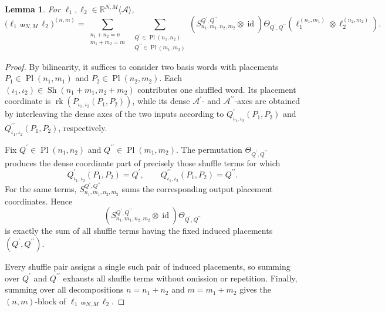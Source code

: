 \documentclass{amsart}
\newtheorem{lemma}[theorem]{Lemma}
\theoremstyle{definition}
\theoremstyle{remark}
\begin{document}
\begin{lemma}
\label{lem:ordered_shuffle}
For
$\ell_1,\ell_2\in
\mathbb{R}^{N,M}\langle\mathcal{A}\rangle$,
\[
    \bigl(
        \ell_1\shuffle_{N,M}\ell_2
    \bigr)^{(n,m)}
    =
    \sum_{\substack{
        n_1+n_2=n\\
        m_1+m_2=m
    }}
    \;
    \sum_{\substack{
        Q^{\prime}\in\operatorname{Pl}(n_1,n_2)\\
        Q^{\prime\prime}\in\operatorname{Pl}(m_1,m_2)
    }}
    \left(
        S^{Q^{\prime},Q^{\prime\prime}}_{n_1,m_1,n_2,m_2}
        \otimes
        \operatorname{id}
    \right)
    \Theta_{Q^{\prime},Q^{\prime\prime}}
    \left(
        \ell_1^{(n_1,m_1)}
        \otimes
        \ell_2^{(n_2,m_2)}
    \right).
\]
\end{lemma}

\begin{proof}
By bilinearity, it suffices to consider two basis words with placements
$P_1\in\operatorname{Pl}(n_1,m_1)$ and
$P_2\in\operatorname{Pl}(n_2,m_2)$. Each
$(\iota_1,\iota_2)\in
\operatorname{Sh}(n_1+m_1,n_2+m_2)$ contributes one shuffled word. Its
placement coordinate is $\operatorname{rk}
        \left(
            P_{\iota_1,\iota_2}(P_1,P_2)
        \right)$,
while its dense $\mathcal{A}^{\prime}$- and
$\mathcal{A}^{\prime\prime}$-axes are obtained by interleaving the dense
axes of the two inputs according to
$Q^{\prime}_{\iota_1,\iota_2}(P_1,P_2)$ and
$Q^{\prime\prime}_{\iota_1,\iota_2}(P_1,P_2)$, respectively.

Fix
$Q^{\prime}\in\operatorname{Pl}(n_1,n_2)$ and
$Q^{\prime\prime}\in\operatorname{Pl}(m_1,m_2)$.
The permutation $\Theta_{Q^{\prime},Q^{\prime\prime}}$ produces the
dense coordinate part of precisely those shuffle terms for which
\[
    Q^{\prime}_{\iota_1,\iota_2}(P_1,P_2)=Q^{\prime},
    \qquad
    Q^{\prime\prime}_{\iota_1,\iota_2}(P_1,P_2)=Q^{\prime\prime}.
\]
For the same terms,
$S^{Q^{\prime},Q^{\prime\prime}}_{n_1,m_1,n_2,m_2}$ sums the
corresponding output placement coordinates. Hence
\[
    \left(
        S^{Q^{\prime},Q^{\prime\prime}}_{n_1,m_1,n_2,m_2}
        \otimes
        \operatorname{id}
    \right)
    \Theta_{Q^{\prime},Q^{\prime\prime}}
\]
is exactly the sum of all shuffle terms having the fixed induced
placements $(Q^{\prime},Q^{\prime\prime})$.

Every shuffle pair assigns a single such pair of induced placements,
so summing over $Q^{\prime}$ and $Q^{\prime\prime}$ exhausts all shuffle
terms without omission or repetition. Finally, summing over all
decompositions $n=n_1+n_2$ and $m=m_1+m_2$ gives the
$(n,m)$-block of $\ell_1\shuffle_{N,M}\ell_2$.
\end{proof}
\end{document}
